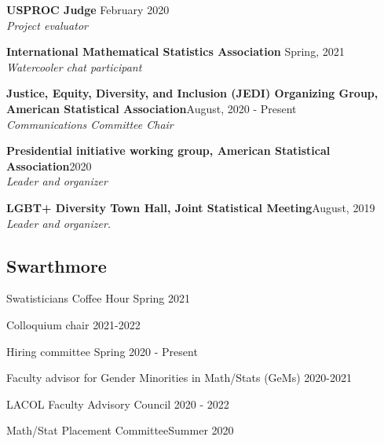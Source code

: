 \documentclass[margin,line]{res}
\newenvironment{list1}{
  \begin{list}{\ding{113}}{%
      \setlength{\itemsep}{0in}
      \setlength{\parsep}{0in} \setlength{\parskip}{0in}
      \setlength{\topsep}{0in} \setlength{\partopsep}{0in} 
      \setlength{\leftmargin}{0.17in}}}{\end{list}}
\begin{document}
\begin{resume}
\begin{list1}
\item[] {\bf USPROC Judge}\hfill { February 2020}\\
{\em Project evaluator} 
\vspace*{2mm}
 
\item[] {\bf International Mathematical Statistics Association} \hfill{Spring, 2021}\\
{\em Watercooler chat participant}
\vspace*{2mm}

\item[] {\bf Justice, Equity, Diversity, and Inclusion (JEDI) Organizing Group, American Statistical Association}\hfill {August, 2020 - Present}\\
{\em Communications Committee Chair} 
\vspace*{2mm}
 
\item[] {\bf Presidential initiative working group, American Statistical Association}\hfill {2020}\\
{\em Leader and organizer} 
\vspace*{2mm}
\item[]{\bf LGBT+ Diversity Town Hall, Joint Statistical Meeting}\hfill{August, 2019}\\
{\em Leader and organizer.}
\end{list1}

\vspace*{-0.7cm}
\subsection{Swarthmore}
\begin{list1}
\item[] {Swatisticians Coffee Hour} \hfill {Spring 2021}
\item[] {Colloquium chair} \hfill {2021-2022}
\item[] {Hiring committee} \hfill {Spring 2020 - Present}
\item[] {Faculty advisor for Gender Minorities in Math/Stats (GeMs)} \hfill {2020-2021}
\item[] {LACOL Faculty Advisory Council} \hfill {2020 - 2022}
\item[] {Math/Stat Placement Committee}\hfill {Summer 2020}
\end{list1}


\end{resume}
\end{document}
